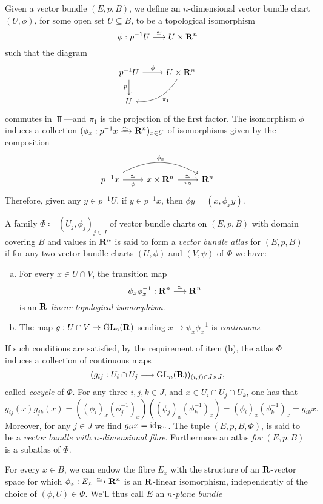 \documentclass[../../../deep-dive]{subfile}
\begin{document}
\begin{definition}
\label{def:vector-bundle-chart-and-atlas}
Given a vector bundle \((E, p, B)\), we define an \(n\)-dimensional vector
bundle chart \((U, \phi)\), for some open set \(U \subseteq B\), to be a
topological isomorphism
\[
\phi: p^{-1} U \overset{\simeq}\longrightarrow U \times \mathbf{R}^n
\]
such that the diagram
\[
\begin{tikzcd}
p^{-1} U \ar[r, "\phi"]
\ar[d, "p"']
&U \times \R^n \ar[ld, bend left, "\pi_1"] \\
U &
\end{tikzcd}
\]
commutes in \(\Top\)---and \(\pi_1\) is the projection of the first factor. The
isomorphism \(\phi\) induces a collection
\((\phi_x: p^{-1} x \isoto \R^n)_{x \in U}\) of isomorphisms given by the
composition
\[
\begin{tikzcd}
p^{-1} x \ar[r, "\phi"', "\dis"]
\ar[rr, "\phi_x", bend left]
&x \times \R^n
\ar[r, "\dis", "\pi_2"']
&\R^n
\end{tikzcd}
\]
Therefore, given any \(y \in p^{-1} U\), if \(y \in p^{-1} x\), then
\(\phi y = (x, \phi_x y)\).
\end{definition}

\begin{definition}
\label{def:vector-bundle-atlas}
A family \(\Phi \coloneq (U_j, \phi_j)_{j \in J}\) of vector bundle charts on
\((E, p, B)\) with domain covering \(B\) and values in \(\mathbf{R}^n\) is said to form
a \emph{vector bundle atlas} for \((E, p, B)\) if for any two vector bundle
charts \((U, \phi)\) and \((V, \psi)\) of \(\Phi\) we have:
\begin{enumerate}[(a)]\setlength\itemsep{0em}
\item For every \(x \in U \cap V\), the transition map
  \[
  \psi_x \phi_x^{-1}: \mathbf{R}^n \overset{\simeq}\longrightarrow \mathbf{R}^n
  \]
  is an \emph{\(\mathbf{R}\)-linear topological isomorphism}.

\item The map \(g: U \cap V \to \operatorname{GL}_n(\mathbf{R})\) sending
  \(x \mapsto \psi_x \phi_x^{-1}\) is \emph{continuous}.
\end{enumerate}
If such conditions are satisfied, by the requirement of item (b), the atlas
\(\Phi\) induces a collection of continuous maps
\[
(g_{i j}: U_i \cap U_j \longrightarrow \operatorname{GL}_n(\mathbf{R}))_{(i, j) \in J \times J},
\]
called \emph{cocycle} of \(\Phi\). For any three \(i, j, k \in J\), and
\(x \in U_i \cap U_j \cap U_k\), one has that
\[
g_{ij}(x) g_{j k}(x)
= ((\phi_i)_x (\phi_j^{-1})_x) ((\phi_j)_x (\phi_k^{-1})_x)
= (\phi_i)_x (\phi_k^{-1})_{x}
= g_{i k} x.
\]
Moreover, for any \(j \in J\) we find \(g_{i i} x = \operatorname{id}_{\mathbf{R}^n}\). The tuple
\((E, p, B, \Phi)\), is said to be a \emph{vector bundle with \(n\)-dimensional
  fibre}. Furthermore an atlas \emph{for} \((E, p, B)\) is a subatlas of
\(\Phi\).

For every \(x \in B\), we can endow the fibre \(E_x\) with the structure of an
\(\mathbf{R}\)-vector space for which \(\phi_x: E_x \isoto \R^n\) is an \(\mathbf{R}\)-linear
isomorphism, independently of the choice of \((\phi, U) \in \Phi\). We'll thus
call \(E\) an \emph{\(n\)-plane bundle}
\end{definition}
\end{document}
